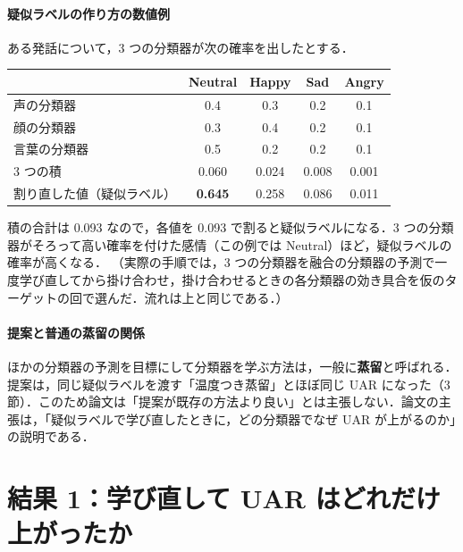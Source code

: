 \documentclass[a4paper,11pt]{ltjsarticle}
\begin{document}
\paragraph{疑似ラベルの作り方の数値例}
ある発話について，3 つの分類器が次の確率を出したとする．
\begin{center}
\begin{tabular}{lcccc}
\toprule
 & Neutral & Happy & Sad & Angry \\
\midrule
\textcolor{cA}{声の分類器} & 0.4 & 0.3 & 0.2 & 0.1 \\
\textcolor{cV}{顔の分類器} & 0.3 & 0.4 & 0.2 & 0.1 \\
\textcolor{cT}{言葉の分類器} & 0.5 & 0.2 & 0.2 & 0.1 \\
\midrule
3 つの積 & 0.060 & 0.024 & 0.008 & 0.001 \\
割り直した値（疑似ラベル） & \textbf{0.645} & 0.258 & 0.086 & 0.011 \\
\bottomrule
\end{tabular}
\end{center}
積の合計は 0.093 なので，各値を 0.093 で割ると疑似ラベルになる．3 つの分類器がそろって高い確率を付けた感情（この例では Neutral）ほど，疑似ラベルの確率が高くなる．
（実際の手順では，3 つの分類器を融合の分類器の予測で一度学び直してから掛け合わせ，掛け合わせるときの各分類器の効き具合を仮のターゲットの回で選んだ．流れは上と同じである．）

\paragraph{提案と普通の蒸留の関係}
ほかの分類器の予測を目標にして分類器を学ぶ方法は，一般に\textbf{蒸留}と呼ばれる．提案は，同じ疑似ラベルを渡す「温度つき蒸留」とほぼ同じ UAR になった（3 節）．このため論文は「提案が既存の方法より良い」とは主張しない．論文の主張は，「疑似ラベルで学び直したときに，どの分類器でなぜ UAR が上がるのか」の説明である．

\section{結果 1：学び直して UAR はどれだけ上がったか}
\end{document}
